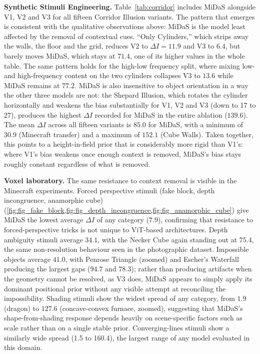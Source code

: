 \documentclass[10pt,twocolumn]{article}
\begin{document}
\textbf{Synthetic Stimuli Engineering.} Table~\ref{tab:corridor} includes MiDaS
alongside V1, V2 and V3 for all fifteen Corridor Illusion variants. The pattern
that emerges is consistent with the qualitative observations above: MiDaS is the
model least affected by the removal of contextual cues. ``Only Cylinders,'' which
strips away the walls, the floor and the grid, reduces V2 to $\Delta I = 11.9$ and
V3 to $6.4$, but barely moves MiDaS, which stays at $71.4$, one of its higher
values in the whole table. The same pattern holds for the high-low frequency
split, where mixing low- and high-frequency content on the two cylinders collapses
V3 to $13.6$ while MiDaS remains at $77.2$. MiDaS is also insensitive to object
orientation in a way the other three models are not: the Shepard Illusion, which
rotates the cylinder horizontally and weakens the bias substantially for V1, V2 and
V3 (down to 17 to 27), produces the highest $\Delta I$ recorded for MiDaS in the
entire ablation ($139.6$). The mean $\Delta I$ across all fifteen variants is
$85.0$ for MiDaS, with a minimum of $30.9$ (Minecraft transfer) and a maximum of
$152.1$ (Cube Walls). Taken together, this points to a height-in-field prior that
is considerably more rigid than V1's: where V1's bias weakens once enough context
is removed, MiDaS's bias stays roughly constant regardless of what is removed.

\textbf{Voxel laboratory.} The same resistance to context removal is visible in
the Minecraft experiments. Forced perspective stimuli (fake block, depth
incongruence, anamorphic cube) (\cref{fig:fig_fake_block,fig:fig_depth_incongruence,fig:fig_anamorphic_cube}) give MiDaS the lowest average $\Delta I$ of any
category ($7.9$), confirming that resistance to forced-perspective tricks is not
unique to ViT-based architectures. Depth ambiguity stimuli average $34.1$, with
the Necker Cube again standing out at $75.4$, the same non-resolution behaviour
seen in the photographic dataset. Impossible objects average $41.0$, with Penrose
Triangle (zoomed) and Escher's Waterfall producing the largest gaps ($94.7$ and
$78.3$); rather than producing artifacts when the geometry cannot be resolved, as
V3 does, MiDaS appears to simply apply its dominant positional prior without any
visible attempt at reconciling the impossibility. Shading stimuli show the widest
spread of any category, from $1.9$ (dragon) to $127.6$ (concave-convex furnace,
zoomed), suggesting that MiDaS's shape-from-shading response depends heavily on
scene-specific factors such as scale rather than on a single stable prior.
Converging-lines stimuli show a similarly wide spread (1.5 to 160.4), the largest
range of any model evaluated in this domain.
\end{document}
